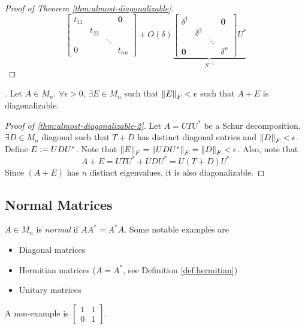 \begin{proof}[Proof of Theorem \ref{thm:almost-diagonalizable}]
$${\begin{bmatrix}
t_{11} & & & \mathbf{0} \\
& t_{22} & & \\
& & \ddots & \\
0 & & & t_{nn} \end{bmatrix} + O(\delta)} \underbrace{\begin{bmatrix} \delta^1 & & & \mathbf{0} \\ & \delta^2 & & \\ & & \ddots & \\ \mathbf{0} & & & \delta^n \end{bmatrix} U^*}_{S^{-1}}
$$
\end{proof}

\begin{theorem}.
\label{thm:almost-diagonalizable-2}
Let $A \in M_n$. $\forall \epsilon > 0$, $\exists E \in M_n$ such that $\left\lVert E\right\rVert_F < \epsilon$ such that $A + E$ is diagonalizable.
\end{theorem}

\begin{proof}[Proof of \ref{thm:almost-diagonalizable-2}]
Let $A = UTU^*$ be a Schur decomposition. $\exists D \in M_n$ diagonal such that $T + D$ has distinct diagonal entries and $\left\lVert D\right\rVert_F < \epsilon$.\\

\noindent Define $E \vcentcolon= UDU^*$. Note that $\left\lVert E\right\rVert_F = \left\lVert UDU^*\right\rVert_F = \left\lVert D\right\rVert_F < \epsilon$. Also, note that
$$
A + E = UTU^* + UDU^* = U(T+D)U^*
$$
Since $(A+E)$ has $n$ distinct eigenvalues, it is also diagonalizable.
\end{proof}

\subsection{Normal Matrices}
\begin{definition}
\label{def:normal-matrices}
$A \in M_n$ is \textit{normal} if $AA^* = A^*A$. Some notable examples are
\begin{itemize}
    \item Diagonal matrices
    \item Hermitian matrices ($A = A^*$, see Definition \ref{def:hermitian})
    \item Unitary matrices
\end{itemize}
A non-example is $\begin{bmatrix}1 & 1 \\ 0 & 1\end{bmatrix}$.
\end{definition}

